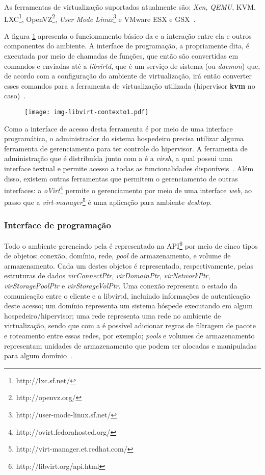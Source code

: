 As ferramentas de virtualização suportadas atualmente são: \emph{Xen},
\emph{QEMU}, KVM, LXC\footnote{http://lxc.sf.net/},
OpenVZ\footnote{http://openvz.org/}, \emph{User Mode
Linux}\footnote{http://user-mode-linux.sf.net/} e VMware ESX e GSX~\cite{libvirtindex}.

A figura \ref{fig:libvirtcontexto1} apresenta o funcionamento básico da
\libvirt{} e a interação entre ela e outros componentes do ambiente. A
interface de programação, a \libvirt{} propriamente dita, é executada por meio
de chamadas de funções, que então são convertidas em comandos e enviadas até a
\emph{libvirtd}, que é um serviço de sistema (ou \emph{daemon}) que, de acordo
com a configuração do ambiente de virtualização, irá então converter esses
comandos para a ferramenta de virtualização utilizada (hipervisor \textbf{kvm}
no caso)~\cite{bolte2010non}.
\begin{figure}[htp]
\centering
\texttt{[image: img-libvirt-contexto1.pdf]}
\label{fig:libvirtcontexto1}
\end{figure}

Como a interface de acesso desta ferramenta é por meio de uma interface
programática, o administrador do sistema hospedeiro precisa
utilizar alguma ferramenta de gerenciamento para ter controle do hipervisor. A
ferramenta de administração que é distribuída junto com a \libvirt{} é a
\emph{virsh}, a qual possui uma interface textual e permite acesso a todas as
funcionalidades disponíveis~\cite{virsh2008asilva}. Além disso, existem outras
ferramentas que permitem o gerenciamento de outras interfaces: a
\emph{oVirt}\footnote{http://ovirt.fedorahosted.org/} permite o
gerenciamento por meio de uma interface \emph{web}, ao passo que a
\emph{virt-manager}\footnote{http://virt-manager.et.redhat.com/} é uma
aplicação para ambiente \emph{desktop}.

\subsubsection{Interface de programação}\label{sec:libvirtapi}

Todo o ambiente gerenciado pela \libvirt{} é representado na
API\footnote{http://libvirt.org/api.html} por meio de cinco tipos de
objetos: conexão, domínio, rede, \emph{pool} de armazenamento, e volume de
armazenamento. Cada um destes objetos é representado, respectivamente, pelas
estruturas de dados \emph{virConnectPtr}, \emph{virDomainPtr},
\emph{virNetworkPtr}, \emph{virStoragePoolPtr} e \emph{virStorageVolPtr}. Uma
conexão representa o estado da comunicação entre o cliente e a
libvirtd, incluindo informações de autenticação deste acesso; um
domínio representa um sistema hóspede executando em algum
hospedeiro/hipervisor; uma rede representa uma rede no ambiente de
virtualização, sendo que com a \libvirt{} é possível adicionar regras de filtragem de
pacote e roteamento entre essas redes, por exemplo; \emph{pools} e volumes de
armazenamento representam unidades de armazenamento que podem ser alocadas e
manipuladas para algum domínio~\cite{libvirtapi}.


